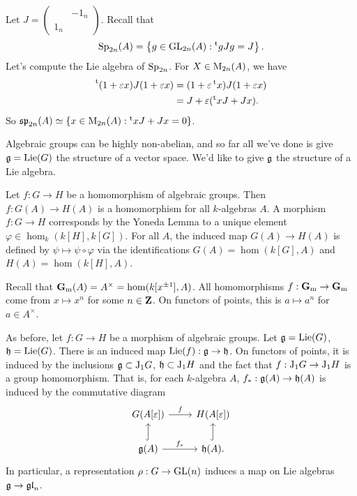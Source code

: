\begin{example}[Symplectic]
Let $J=\begin{pmatrix} & -1_n \\ 1_n \end{pmatrix}$. Recall that 
\[
  \operatorname{Sp}_{2n}(A) = \left\{g\in \operatorname{GL}_{2n}(A) : \prescript{\mathrm{t}}{}{g} J g=J\right\} .
\]
Let's compute the Lie algebra of $\operatorname{Sp}_{2n}$. For $X\in \operatorname{M}_{2n}(A)$, we 
have 
\begin{align*}
  \prescript{\mathrm{t}}{}{(1+\varepsilon x)} J (1+\varepsilon x) 
    &= (1+\varepsilon\prescript{\mathrm{t}}{}{x}) J (1+\varepsilon x) \\
    &= J+\varepsilon(\prescript{\mathrm{t}}{}{x} J+J x) .
\end{align*}
So 
$\mathfrak{sp}_{2n}(A) \simeq \left\{x\in \operatorname{M}_{2n}(A):\prescript{\mathrm{t}}{}{x} J+J x = 0\right\}$. 
\end{example}

Algebraic groups can be highly non-abelian, and so far all we've done is give 
$\mathfrak{g}=\operatorname{Lie}(G)$ the structure of a vector space. We'd like to give $\mathfrak{g}$ the 
structure of a Lie algebra. 

Let $f:G\to H$ be a homomorphism of algebraic groups. Then $f:G(A)\to H(A)$ is 
a homomorphism for all $k$-algebras $A$. A morphism $f:G\to H$ corresponds 
by the Yoneda Lemma to a unique element $\varphi\in \hom_k(k[H],k[G])$. For all 
$A$, the induced map $G(A)\to H(A)$ is defined by 
$\psi\mapsto \psi\circ\varphi$ via the identifications 
$G(A)=\hom(k[G],A)$ and $H(A)=\hom(k[H],A)$. 

\begin{example}
Recall that $\mathbf{G}_\mathrm{m}(A)=A^\times = \hom(k[x^{\pm 1}], A)$. All homomorphisms 
$f:\mathbf{G}_\mathrm{m}\to \mathbf{G}_\mathrm{m}$ come from $x\mapsto x^n$ for some $n\in \mathbf{Z}$. On functors of 
points, this is $a\mapsto a^n$ for $a\in A^\times$. 
\end{example}

As before, let $f:G\to H$ be a morphism of algebraic groups. Let 
$\mathfrak{g}=\operatorname{Lie}(G)$, $\mathfrak{h}=\operatorname{Lie}(G)$. There is an induced map 
$\operatorname{Lie}(f):\mathfrak{g}\to \mathfrak{h}$. On functors of points, it is induced by the 
inclusions $\mathfrak{g}\subset \mathrm{J}_1 G$, $\mathfrak{h}\subset \mathrm{J}_1 H$ and the fact that 
$f:\mathrm{J}_1 G\to \mathrm{J}_1 H$ is a group homomorphism. That is, for each 
$k$-algebra $A$, $f_\ast:\mathfrak{g}(A)\to \mathfrak{h}(A)$ is induced by the commutative 
diagram 
\[\begin{tikzcd}
  G(A[\varepsilon]) \ar[r, "f"] 
    & H(A[\varepsilon]) \\
  \fg(A) \ar[r, "f_\ast"] \ar[u, hook] 
    & \fh(A). \ar[u, hook]
\end{tikzcd}\]
In particular, a representation $\rho:G\to \operatorname{GL}(n)$ induces a map on 
Lie algebras $\mathfrak{g}\to \mathfrak{gl}_n$. 

